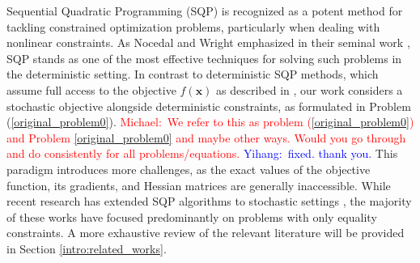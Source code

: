 \documentclass[aos]{imsart}
\numberwithin{equation}{section}
\theoremstyle{plain}
\newcommand{\michael}[1]{\textcolor{red}{Michael:\ #1}}
\newcommand{\yihang}[1]{\textcolor{blue}{Yihang:\ #1}}
\begin{document}
Sequential Quadratic Programming (SQP) is recognized as a potent method for tackling constrained optimization problems, particularly when dealing with nonlinear constraints. As Nocedal and Wright emphasized in their seminal work \cite{jorge2006numerical}, SQP stands as one of the most effective techniques for solving such problems in the deterministic setting.
In contrast to deterministic SQP methods, which assume full access to the objective $f(\bm{x})$ as described in \cite{boggs1995sequential, jorge2006numerical}, our work considers a stochastic objective alongside deterministic constraints, as formulated in Problem (\ref{original_problem0}).
\michael{We refer to this as problem (\ref{original_problem0}) and Problem \eqref{original_problem0} and maybe other ways.  Would you go through and do consistently for all problems/equations.}
\yihang{fixed. thank you.}
This paradigm introduces more challenges, as the exact values of the objective function, its gradients, and Hessian matrices are generally inaccessible.
While recent research has extended SQP algorithms to stochastic settings \cite{na2022asymptotic, na2023inequality, fang2022fully, na2023adaptive, curtis2023worst, curtis2023sequential, curtis2021inexact, berahas2021stochastic, duchi2021asymptotic}, the majority of these works have focused predominantly on problems with only equality constraints. A more exhaustive review of the relevant literature will be provided in Section \ref{intro:related_works}.
\end{document}

